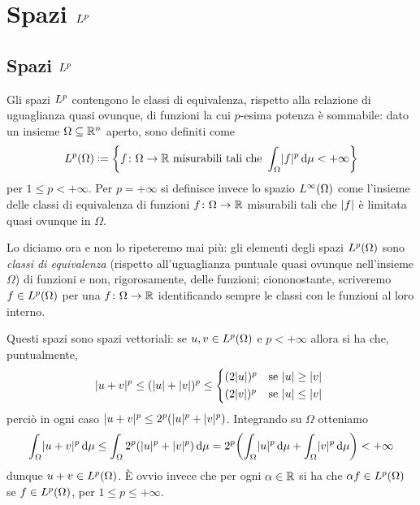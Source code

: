 \chapter{Spazi $\lclass[p]$}
\label{ch:spazi-Lp}

\section{Spazi $\lclass[p]$}
\label{sec:spazi-Lp}
Gli spazi $\lclass[p]$ contengono le classi di equivalenza, rispetto alla relazione di uguaglianza quasi ovunque, di funzioni la cui $p$-esima potenza è sommabile: dato un insieme $\Omega\subseteq\R^n$ aperto, sono definiti come
\begin{equation*}
    \leb[p]{\Omega}\defeq\biggl\{f\colon\Omega\to\R\text{ misurabili tali che }\int_\Omega\abs{f}^p\,\dd\mu<+\infty\biggr\}
\end{equation*}
per $1\le p<+\infty$.
Per $p=+\infty$ si definisce invece lo spazio $\leb[\infty]{\Omega}$ come l'insieme delle classi di equivalenza di funzioni $f\colon\Omega\to\R$ misurabili tali che $\abs{f}$ è limitata quasi ovunque in $\Omega$.
\begin{osservazione}
    Lo diciamo ora e non lo ripeteremo mai più: gli elementi degli spazi $\leb[p]{\Omega}$ sono \emph{classi di equivalenza} (rispetto all'uguaglianza puntuale quasi ovunque nell'insieme $\Omega$) di funzioni e non, rigorosamente, delle funzioni; ciononostante, scriveremo $f\in\leb[p]{\Omega}$ per una $f\colon\Omega\to\R$ identificando sempre le classi con le funzioni al loro interno.
\end{osservazione}
Questi spazi sono spazi vettoriali: se $u,v\in\leb[p]{\Omega}$ e $p<+\infty$ allora si ha che, puntualmente, 
\begin{equation}
    \abs{u+v}^p\le(\abs{u}+\abs{v})^p\le
    \begin{cases*}
        (2\abs{u})^p & se $\abs{u}\ge\abs{v}$\\
        (2\abs{v})^p & se $\abs{u}\le\abs{v}$
    \end{cases*}
\end{equation}
perciò in ogni caso $\abs{u+v}^p\le 2^p(\abs{u}^p+\abs{v}^p)$.
Integrando su $\Omega$ otteniamo
\begin{equation}
    \int_\Omega \abs{u+v}^p\,\dd\mu\le
    \int_\Omega 2^p(\abs{u}^p+\abs{v}^p)\,\dd\mu=
    2^p\biggl(\int_\Omega \abs{u}^p\,\dd\mu + \int_\Omega \abs{v}^p\,\dd\mu\biggr)<+\infty
\end{equation}
dunque $u+v\in\leb[p]{\Omega}$.
È ovvio invece che per ogni $\alpha\in\R$ si ha che $\alpha f\in\leb[p]{\Omega}$ se $f\in\leb[p]{\Omega}$, per $1\le p\le+\infty$.

